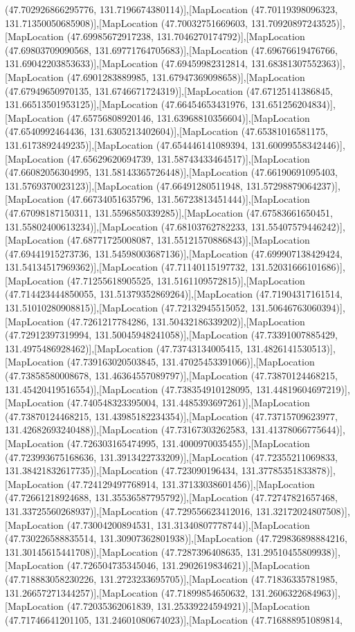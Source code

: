 (47.702926866295776, 131.7196674380114)],[MapLocation (47.70119398096323, 131.71350050685908)],[MapLocation (47.70032751669603, 131.70920897243525)],[MapLocation (47.69985672917238, 131.7046270174792)],[MapLocation (47.69803709090568, 131.69771764705683)],[MapLocation (47.69676619476766, 131.69042203853633)],[MapLocation (47.69459982312814, 131.68381307552363)],[MapLocation (47.6901283889985, 131.67947369098658)],[MapLocation (47.67949650970135, 131.6746671724319)],[MapLocation (47.67125141386845, 131.66513501953125)],[MapLocation (47.66454653431976, 131.651256204834)],[MapLocation (47.65756808920146, 131.63968810356604)],[MapLocation (47.6540992464436, 131.6305213402604)],[MapLocation (47.65381016581175, 131.6173892449235)],[MapLocation (47.654446141089394, 131.60099558342446)],[MapLocation (47.65629620694739, 131.58743433464517)],[MapLocation (47.66082056304995, 131.58143365726448)],[MapLocation (47.66190691095403, 131.5769370023123)],[MapLocation (47.66491280511948, 131.57298879064237)],[MapLocation (47.66734051635796, 131.56723813451444)],[MapLocation (47.67098187150311, 131.5596850339285)],[MapLocation (47.67583661650451, 131.55802400613234)],[MapLocation (47.68103762782233, 131.55407579446242)],[MapLocation (47.68771725008087, 131.55121570886843)],[MapLocation (47.69441915273736, 131.54598003687136)],[MapLocation (47.699907138429424, 131.54134517969362)],[MapLocation (47.71140115197732, 131.52031666101686)],[MapLocation (47.71255618905525, 131.5161109572815)],[MapLocation (47.714423444850055, 131.51379352869264)],[MapLocation (47.71904317161514, 131.51010280908815)],[MapLocation (47.72132945515052, 131.50646763060394)],[MapLocation (47.7261217784286, 131.50432186339202)],[MapLocation (47.72912397319994, 131.50045948241058)],[MapLocation (47.73391007885429, 131.4975486928462)],[MapLocation (47.73743134005415, 131.4826141530513)],[MapLocation (47.739163020503845, 131.47025453391066)],[MapLocation (47.73858580008678, 131.46364557089797)],[MapLocation (47.73870124468215, 131.45420419516554)],[MapLocation (47.738354910128095, 131.44819604697219)],[MapLocation (47.740548323395004, 131.4485393697261)],[MapLocation (47.73870124468215, 131.43985182234354)],[MapLocation (47.73715709623977, 131.42682693240488)],[MapLocation (47.73167303262583, 131.41378066775644)],[MapLocation (47.726303165474995, 131.4000970035455)],[MapLocation (47.723993675168636, 131.3913422733209)],[MapLocation (47.72355211069833, 131.38421832617735)],[MapLocation (47.723090196434, 131.37785351833878)],[MapLocation (47.724129497768914, 131.37133038601456)],[MapLocation (47.72661218924688, 131.35536587795792)],[MapLocation (47.72747821657468, 131.33725560268937)],[MapLocation (47.729556623412016, 131.32172024807508)],[MapLocation (47.73004200894531, 131.31340807778744)],[MapLocation (47.730226588835514, 131.30907362801938)],[MapLocation (47.729836898884216, 131.30145615441708)],[MapLocation (47.7287396408635, 131.29510455809938)],[MapLocation (47.726504735345046, 131.2902619834621)],[MapLocation (47.718883058230226, 131.2723233695705)],[MapLocation (47.71836335781985, 131.26657271344257)],[MapLocation (47.71899854650632, 131.2606322684963)],[MapLocation (47.72035362061839, 131.25339224594921)],[MapLocation (47.71746641201105, 131.24601080674023)],[MapLocation (47.716888951089814, 